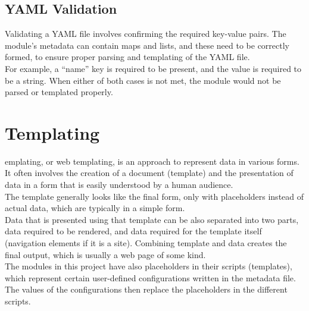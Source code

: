 \subsection{YAML Validation}
Validating a YAML file involves confirming the required key-value pairs. The module’s metadata can contain maps and lists, and these need to be correctly formed, to ensure proper parsing and templating of the YAML file.\\
For example, a “name” key is required to be present, and the value is required to be a string. When either of both cases is not met, the module would not be parsed or templated properly.


\section{Templating}
emplating, or web templating, is an approach to represent data in various forms. It often involves the creation of a document (template) and the presentation of data in a form that is easily understood by a human audience.\\
The template generally looks like the final form, only with placeholders instead of actual data, which are typically in a simple form.\\
Data that is presented using that template can be also separated into two parts, data required to be rendered, and data required for the template itself (navigation elements if it is a site). Combining template and data creates the final output, which is usually a web page of some kind\cite{templating}.\\
The modules in this project have also placeholders in their scripts (templates), which represent certain user-defined configurations written in the metadata file. The values of the configurations then replace the placeholders in the different scripts.\\
